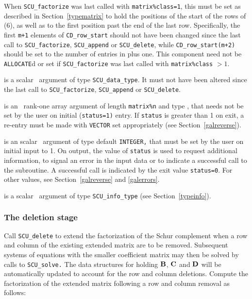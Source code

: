 \documentclass{galahad}
\newcommand{\packagename}{SCU}
\begin{document}
\begin{description}
\begin{description}
When {\tt \packagename\_factorize} was last called with {\tt matrix\%class=1}, 
this must be set as described in Section~\ref{typematrix} to hold the 
positions of the start of the rows of (6), as well as to the first 
position past the end of the last row. 
Specifically, the first {\tt m+1} elements 
of {\tt CD\_row\_start} should not have been changed since the last call to 
{\tt \packagename\_factorize}, {\tt \packagename\_append} or 
{\tt \packagename\_delete}, while 
{\tt CD\_row\_start(m+2)} should be set to the number of entries in 
 plus one. 
This component need not be {\tt ALLOCATE}d or set if 
{\tt \packagename\_factorize} was last called with {\tt matrix\%class} $> 1$. 
 
\end{description} 
 
 is a scalar \intentinout\ argument of type 
{\tt \packagename\_data\_type}. 
It must not have been altered since the last call to  
{\tt \packagename\_factorize}, 
{\tt \packagename\_append} or 
{\tt \packagename\_delete}. 
 
 is an \intentinout\ rank-one array argument of length 
{\tt matrix\%n} 
and type \realdp, that needs not be set by 
the user on initial ({\tt status=1)} entry. If {\tt status} is greater than 
1 on exit, a re-entry must be made with {\tt VECTOR} set appropriately 
(see Section~\ref{galreverse}). 
 
 is an scalar \intentinout\ argument of type default 
{\tt INTEGER,} that  
must be set by the user on initial input to 1. On output, the value of 
{\tt status} 
is used to request additional information, to signal an error 
in the input data or to indicate a successful call to the subroutine. 
A successful call is indicated by the exit value {\tt status=0}. 
For other values, see Section~\ref{galreverse} and \ref{galerrors}. 
 
 is a scalar \intentinout\ argument of type 
{\tt \packagename\_info\_type} (see Section~\ref{typeinfo}). 
 
\end{description}


\subsubsection{The deletion stage}
Call {\tt \packagename\_delete} to extend the factorization of the Schur 
complement when a row and column of the existing 
extended matrix are to be removed. 
Subsequent systems of equations with the smaller 
coefficient matrix may then be solved by calls to {\tt \packagename\_solve.} 
The data structures for holding ${\mathbf{B}}$, ${\mathbf{C}}$ and ${\mathbf{D}}$ will be 
automatically updated to account for the row and column deletions. 
Compute the factorization of the extended matrix 
following a row and column removal as follows:
\vspace*{1mm}
\end{document}

